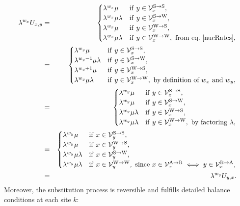 \begin{align}
\lambda^{w_x} U_{x, y}
& = &
\begin{cases}
\lambda^{w_x} \mu
& \mathrm{if} \ y \in \NxSS, \\
\lambda^{w_x} \mu \lambda
& \mathrm{if} \ y \in \NxSW, \\
\lambda^{w_x} \mu
& \mathrm{if} \ y \in \NxWS, \\
\lambda^{w_x} \mu \lambda
& \mathrm{if} \ y \in \NxWW, \ \textrm{from eq.}\ \ref{nucRates},
\end{cases} \\
& = &
\begin{cases}
\lambda^{w_y} \mu
& \mathrm{if} \ y \in \NxSS, \\
\lambda^{w_y - 1} \mu \lambda
& \mathrm{if} \ y \in \NxSW, \\
\lambda^{w_y + 1} \mu
& \mathrm{if} \ y \in \NxWS, \\
\lambda^{w_y} \mu \lambda
& \mathrm{if} \ y \in \NxWW, \ \textrm{by definition of} \ w_x \ \text{and} \ w_y,
\end{cases} \\
& = &
\begin{cases}
\lambda^{w_y} \mu
& \mathrm{if} \ y \in \NxSS, \\
\lambda^{w_y} \mu
& \mathrm{if} \ y \in \NxSW, \\
\lambda^{w_y} \mu \lambda
& \mathrm{if} \ y \in \NxWS, \\
\lambda^{w_y} \mu \lambda
& \mathrm{if} \ y \in \NxWW, \ \textrm{by factoring} \ \lambda,
\end{cases} \\
& = &
\begin{cases}
\lambda^{w_y} \mu
& \mathrm{if} \ x \in \NySS, \\
\lambda^{w_y} \mu
& \mathrm{if} \ x \in \NyWS, \\
\lambda^{w_y} \mu \lambda
& \mathrm{if} \ x \in \NySW, \\
\lambda^{w_y} \mu \lambda
& \mathrm{if} \ x \in \NyWW, \ \textrm{since} \ x \in \NxAB \iff y \in \NyBA,
\end{cases} \\
& = &
\lambda^{w_y} U_{y,x}.
\label{codonMutBalance}
\end{align}
Moreover, the \gls{substitution} process is reversible and fulfills detailed balance conditions at each site $k$:
